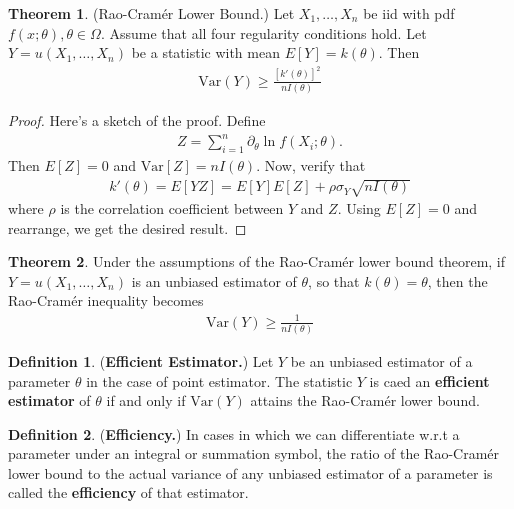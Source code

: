 \documentclass{book}
\theoremstyle{definition}
\newtheorem{defn}{Definition}[section]
\newtheorem{thm}{Theorem}[section]
\newcommand{\p}{\partial}
\newcommand{\f}[2]{\frac{#1}{#2}}
\begin{document}
\begin{thm}
	(Rao-Cram\'er Lower Bound.) Let $X_1,\dots, X_n$ be iid with pdf $f(x;\theta), \theta \in \Omega$. Assume that all four regularity conditions hold. Let $Y = u(X_1,\dots,X_n)$ be a statistic with mean $E[Y] = k(\theta)$. Then
	\begin{align}
	\text{Var}(Y) \geq \f{[k'(\theta)]^2}{nI(\theta)}
	\end{align}
\end{thm}

\begin{proof}
	Here's a sketch of the proof. Define 
	\begin{align}
	Z = \sum^n_{i=1} \p_\theta \ln f(X_i;\theta).
	\end{align}
	Then $E[Z] = 0$ and $\text{Var}[Z] = nI(\theta)$. Now, verify that
	\begin{align}
	k'(\theta) = E[YZ] = E[Y]E[Z] + \rho \sigma_Y \sqrt{nI(\theta)}
	\end{align} 
	where $\rho$ is the correlation coefficient between $Y$ and $Z$. Using $E[Z] = 0$ and rearrange, we get the desired result. 
\end{proof}



\begin{thm}
	Under the assumptions of the Rao-Cram\'er lower bound theorem, if $Y = u(X_1,\dots,X_n)$ is an unbiased estimator of $\theta$, so that $k(\theta) = \theta$, then the Rao-Cram\'er inequality becomes 
	\begin{align}
	\text{Var}(Y) \geq \f{1}{nI(\theta)}
	\end{align}
\end{thm}





\begin{defn}
	(\textbf{Efficient Estimator.}) Let $Y$ be an unbiased estimator of a parameter $\theta$ in the case of point estimator. The statistic $Y$ is caed an \textbf{efficient estimator} of $\theta$ if and only if $\text{Var}(Y)$ attains the Rao-Cram\'er lower bound.  
\end{defn}


\begin{defn}
	(\textbf{Efficiency.}) In cases in which we can differentiate w.r.t a parameter under an integral or summation symbol, the ratio of the Rao-Cram\'er lower bound to the actual variance of any unbiased estimator of a parameter is called the \textbf{efficiency} of that estimator. 
\end{defn}
\end{document}
